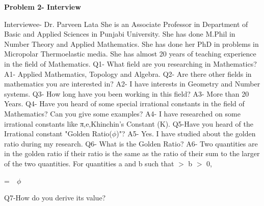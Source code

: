 \documentclass[12pt]{article}
\begin{document}
\begin{center}\textbf{Problem 2- Interview}\end{center}
Interviewee- Dr. Parveen Lata\newline
She is an Associate Professor in Department of Basic and Applied Sciences in Punjabi University. She has done M.Phil in Number Theory and Applied Mathematics. She has done her PhD in problems in Micropolar Thermoelastic media. She has almost 20 years of teaching experience in the field of Mathematics.\newline\newline
Q1- What field are you researching in Mathematics?\newline
A1- Applied Mathematics, Topology and Algebra.\newline\newline
Q2- Are there other fields in mathematics you are interested in?\newline
A2- I have interests in Geometry and Number systems.\newline\newline
Q3- How long have you been working in this field?\newline
A3- More than 20 Years.\newline\newline
Q4- Have you heard of some special irrational constants in the field of Mathematics? Can you give some examples?\newline
A4- I have researched on some irrational constants like π,e,Khinchin's Constant (K).\newline\newline
Q5-Have you heard of the Irrational constant "Golden Ratio($\phi$)"?\newline
A5- Yes. I have studied about the golden ratio during my research.\newline\newline
Q6- What is the Golden Ratio?\newline
A6- Two quantities are in the golden ratio if their ratio is the same as the ratio of their sum to the larger of the two quantities. For quantities a and b such that $>$ b $>$ 0,\newline\newline
\begin{center}{={}\ {}\ $\phi$}\end{center}\newline
Q7-How do you derive its value?\newline
\end{document}
